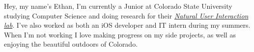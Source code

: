 

\begin{cvparagraph}

Hey, my name's Ethan, I'm  currently a Junior at Colorado State University studying  Computer Science and doing research for their \textit{\href{https://nuilab.org/}{Natural User Interaction lab}}. I've also worked as both an iOS developer and IT intern during my summers. When I'm not working I love making progress on my side projects, as well as enjoying the beautiful outdoors of Colorado.
\end{cvparagraph}
